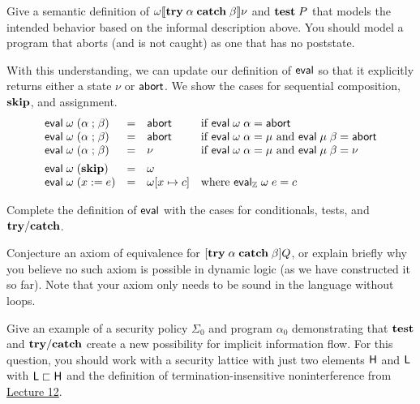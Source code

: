 \documentclass[11pt]{article}
\newcommand{\courseurl}{https://15316-cmu.github.io/2026/}
\begin{document}
\begin{task}[10 points]\rm
  Give a semantic definition of $\omega \llbracket \mathbf{try}\; \alpha\; \mathbf{catch}\; \beta \rrbracket \nu$ and
  $\mathbf{test}\; P$ that models the intended behavior based on the informal
  description above.  You should model a program that aborts (and is not caught)
  as one that has no poststate.
\end{task}

With this understanding, we can update our definition of $\mathsf{eval}$ so that it
explicitly returns either a state $\nu$ or $\mathsf{abort}$.  We show the cases for
sequential composition, $\mathbf{skip}$, and assignment.
\[
  \begin{array}{lcll}
    \mathsf{eval}\; \omega\; (\alpha \mathrel{;} \beta) & = & \mathsf{abort}
    & \mbox{if $\mathsf{eval}\; \omega\; \alpha = \mathsf{abort}$} \\
    \mathsf{eval}\; \omega\; (\alpha \mathrel{;} \beta) & = & \mathsf{abort}
    & \mbox{if $\mathsf{eval}\; \omega\; \alpha = \mu$ and $\mathsf{eval}\; \mu\; \beta = \mathsf{abort}$} \\
    \mathsf{eval}\; \omega\; (\alpha \mathrel{;} \beta) & = & \nu
    & \mbox{if $\mathsf{eval}\; \omega\; \alpha = \mu$ and $\mathsf{eval}\; \mu\; \beta = \nu$} \\[1ex]
    \mathsf{eval}\; \omega\; (\mathbf{skip}) & = & \omega \\
    \mathsf{eval}\; \omega\; (x := e) & = & \omega[x \mapsto c]
    & \mbox{where $\mathsf{eval}_{\mathbb{Z}}\; \omega\; e = c$}
  \end{array}
\]

\begin{task}[15 points]\rm
  \label{task:eval}
  Complete the definition of $\mathsf{eval}$ with the cases for conditionals,
  tests, and $\mathbf{try/catch}$.
\end{task}

\begin{task}[10 points]\rm
  Conjecture an axiom of equivalence for $[\mathbf{try}\; \alpha\; \mathbf{catch}\; \beta]Q$, or explain
  briefly why you believe no such axiom is possible in dynamic logic (as we have
  constructed it so far).  Note that your axiom only needs to be sound in the
  language without loops.
\end{task}

\begin{task}[5 points]\rm
  Give an example of a security policy $\Sigma_0$ and program $\alpha_0$
  demonstrating that $\mathbf{test}$ and $\mathbf{try/catch}$ create a new possibility for
  implicit information flow.  For this question, you should work with a security
  lattice with just two elements $\mathsf{H}$ and $\mathsf{L}$ with
  $\mathsf{L} \sqsubset \mathsf{H}$ and the definition of termination-insensitive
  noninterference from \href{\courseurl/lectures/12-infoflow.pdf}{Lecture 12}.
\end{task}
\end{document}
